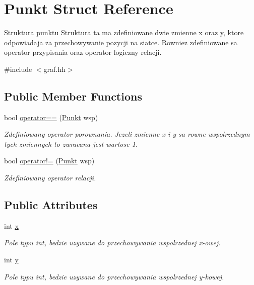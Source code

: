 \hypertarget{struct_punkt}{\section{Punkt Struct Reference}
\label{struct_punkt}
}


Struktura punktu Struktura ta ma zdefiniowane dwie zmienne x oraz y, ktore odpowiadaja za przechowywanie pozycji na siatce. Rowniez zdefiniowane sa operator przypisania oraz operator logiczny relacji.  




{\ttfamily \#include $<$graf.\-hh$>$}

\subsection*{Public Member Functions}
\begin{DoxyCompactItemize}
\item 
bool \hyperlink{struct_punkt_a93a161118cc9676368dbc7c4c9df86a0}{operator==} (\hyperlink{struct_punkt}{Punkt} wsp)
\begin{DoxyCompactList}\small\item\em Zdefiniowany operator porownania. Jezeli zmienne x i y sa rowne wspolrzednym tych zmiennych to zwracana jest wartosc 1. \end{DoxyCompactList}\item 
bool \hyperlink{struct_punkt_a47ca4abd0c2dbcd21a854b5056e5be6e}{operator!=} (\hyperlink{struct_punkt}{Punkt} wsp)
\begin{DoxyCompactList}\small\item\em Zdefiniowany operator relacji. \end{DoxyCompactList}\end{DoxyCompactItemize}
\subsection*{Public Attributes}
\begin{DoxyCompactItemize}
\item 
int \hyperlink{struct_punkt_a3c8936f679ef8fc4c1380ebc45820dc4}{x}
\begin{DoxyCompactList}\small\item\em Pole typu int, bedzie uzywane do przechowywania wspolrzednej x-\/owej. \end{DoxyCompactList}\item 
int \hyperlink{struct_punkt_a68c1591209ee35bec2189fb87cbe57bb}{y}
\begin{DoxyCompactList}\small\item\em Pole typu int, bedzie uzywane do przechowywania wspolrzednej y-\/kowej. \end{DoxyCompactList}\end{DoxyCompactItemize}


